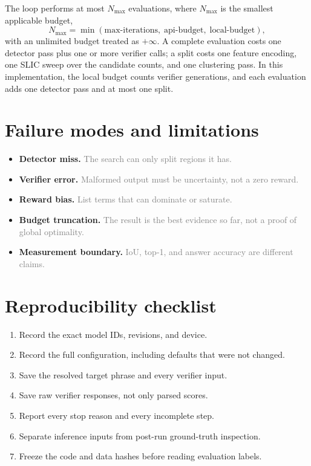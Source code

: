 \documentclass[11pt]{article}
\newcommand{\ph}[1]{\textcolor{gray}{#1}}   %
\begin{document}
The loop performs at most $N_{\max}$ evaluations, where $N_{\max}$ is the
smallest applicable budget,
\begin{equation}
  N_{\max} = \min\left(
    \text{max-iterations},
    \; \text{api-budget},
    \; \text{local-budget}
  \right),
\end{equation}
with an unlimited budget treated as $+\infty$. A complete evaluation costs one
detector pass plus one or more verifier calls; a split costs one feature
encoding, one SLIC sweep over the candidate counts, and one clustering pass. In
this implementation, the local budget counts verifier generations, and each
evaluation adds one detector pass and at most one split.

\section{Failure modes and limitations}

\begin{itemize}
  \item \textbf{Detector miss.} \ph{The search can only split regions it has.}
  \item \textbf{Verifier error.} \ph{Malformed output must be uncertainty, not a
  zero reward.}
  \item \textbf{Reward bias.} \ph{List terms that can dominate or saturate.}
  \item \textbf{Budget truncation.} \ph{The result is the best evidence so far,
  not a proof of global optimality.}
  \item \textbf{Measurement boundary.} \ph{IoU, top-1, and answer accuracy are
  different claims.}
\end{itemize}

\section{Reproducibility checklist}

\begin{enumerate}
  \item Record the exact model IDs, revisions, and device.
  \item Record the full configuration, including defaults that were not changed.
  \item Save the resolved target phrase and every verifier input.
  \item Save raw verifier responses, not only parsed scores.
  \item Report every stop reason and every incomplete step.
  \item Separate inference inputs from post-run ground-truth inspection.
  \item Freeze the code and data hashes before reading evaluation labels.
\end{enumerate}
\end{document}

